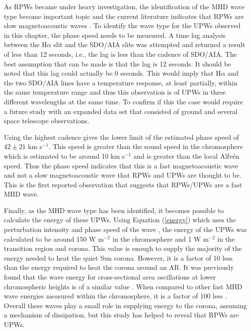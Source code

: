 	As RPWs became under heavy investigation, the identification of the MHD wave type become important topic and the current literature indicates that RPWs are slow magnetoacoustic waves \citep{Bloomfiel2008}.
	To identify the wave type for the UPWs observed in this chapter, the phase speed needs to be measured.
	A time lag analysis between the H$\alpha$ slit and the SDO/AIA slits was attempted and returned a result of less than 12 seconds, i.e., the lag is less than the cadence of SDO/AIA.
	The best assumption that can be made is that the lag is 12 seconds.
	It should be noted that this lag could actually be 0 seconds. 
	This would imply that H$\alpha$ and the two SDO/AIA lines have a temperature response, at least partially, within the same temperature range and thus this observation is of UPWs in three different wavelengths at the same time. 
	To confirm if this the case would require a future study with an expanded data set that consisted of ground and several space telescope observations.
	
	Using the highest cadence gives the lower limit of the estimated phase speed of $42\pm21$ km s$^{-1}$.
	This speed is greater than the sound speed in the chromosphere which is estimated to be around 10 km s$^{-1}$ \citep{Morton2012} and is greater than the local Alfv\'en speed.
	Thus the phase speed indicates that this is a fast magnetoacoustic wave and not a slow magnetoacoustic wave that RPWs and UPWs are thought to be.
    This is the first reported observation that suggests that RPWs/UPWs are a fast MHD wave.
    
    Finally, as the MHD wave type has been identified, it becomes possible to calculate the energy of these UPWs.
    Using Equation (\ref{energy}) which uses the perturbation intensity and phase speed of the wave \citep{Kitagawa2010}, the energy of the UPWs was calculated to be around 150 W m$^{-2}$ in the chromosphere and 1 W m$^{-2}$ in the transition region and corona.
    This value is enough to supply the majority of the energy needed to heat the quiet Sun corona.
    However, it is a factor of 10 less than the energy required to heat the corona around an AR.
    It was previously found that the wave energy for cross-sectional area oscillations at lower chromospheric heights is of a similar value  \citep{0004-637X-806-1-132}. 
    When compared to other fast MHD wave energies measured within the chromosphere, it is a factor of 100 less \citep{Morton2012}. 
    Overall these waves play a small role in supplying energy to the corona, assuming a mechanism of dissipation, but this study has helped to reveal that RPWs are UPWs.
    
